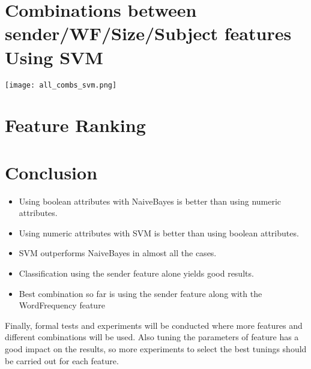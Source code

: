 \section{Combinations between sender/WF/Size/Subject features Using SVM}
\texttt{[image: all\_combs\_svm.png]}


\section{Feature Ranking}

\section{Conclusion}
\begin{itemize}
\item Using boolean attributes with NaiveBayes is better than using numeric attributes.
\item Using numeric attributes with SVM is better than using boolean attributes.
\item SVM outperforms NaiveBayes in almost all the cases.
\item Classification using the sender feature alone yields good results.
\item Best combination so far is using the sender feature along with the WordFrequency feature
\end{itemize}

Finally, formal tests and experiments will be conducted where more features and different combinations will be used. Also tuning the parameters of feature has a good impact on the results, so more experiments to select the best tunings should be carried out for each feature.

